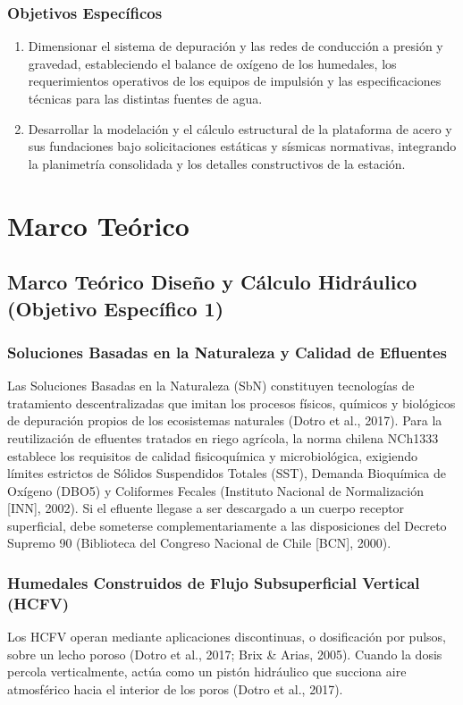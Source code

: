 \documentclass[12pt, letterpaper]{report}
\begin{document}
\subsection{Objetivos Específicos}
\begin{enumerate}
    \item Dimensionar el sistema de depuración y las redes de conducción a presión y gravedad, estableciendo el balance de oxígeno de los humedales, los requerimientos operativos de los equipos de impulsión y las especificaciones técnicas para las distintas fuentes de agua.
    \item Desarrollar la modelación y el cálculo estructural de la plataforma de acero y sus fundaciones bajo solicitaciones estáticas y sísmicas normativas, integrando la planimetría consolidada y los detalles constructivos de la estación.
\end{enumerate}





\chapter{Marco Teórico}

\section{Marco Teórico Diseño y Cálculo Hidráulico (Objetivo Específico 1)}

\subsection{Soluciones Basadas en la Naturaleza y Calidad de Efluentes}
Las Soluciones Basadas en la Naturaleza (SbN) constituyen tecnologías de tratamiento descentralizadas que imitan los procesos físicos, químicos y biológicos de depuración propios de los ecosistemas naturales (Dotro et al., 2017). Para la reutilización de efluentes tratados en riego agrícola, la norma chilena NCh1333 establece los requisitos de calidad fisicoquímica y microbiológica, exigiendo límites estrictos de Sólidos Suspendidos Totales (SST), Demanda Bioquímica de Oxígeno (DBO5) y Coliformes Fecales (Instituto Nacional de Normalización [INN], 2002). Si el efluente llegase a ser descargado a un cuerpo receptor superficial, debe someterse complementariamente a las disposiciones del Decreto Supremo 90 (Biblioteca del Congreso Nacional de Chile [BCN], 2000).

\subsection{Humedales Construidos de Flujo Subsuperficial Vertical (HCFV)}
Los HCFV operan mediante aplicaciones discontinuas, o dosificación por pulsos, sobre un lecho poroso (Dotro et al., 2017; Brix \& Arias, 2005). Cuando la dosis percola verticalmente, actúa como un pistón hidráulico que succiona aire atmosférico hacia el interior de los poros (Dotro et al., 2017). 
\end{document}
